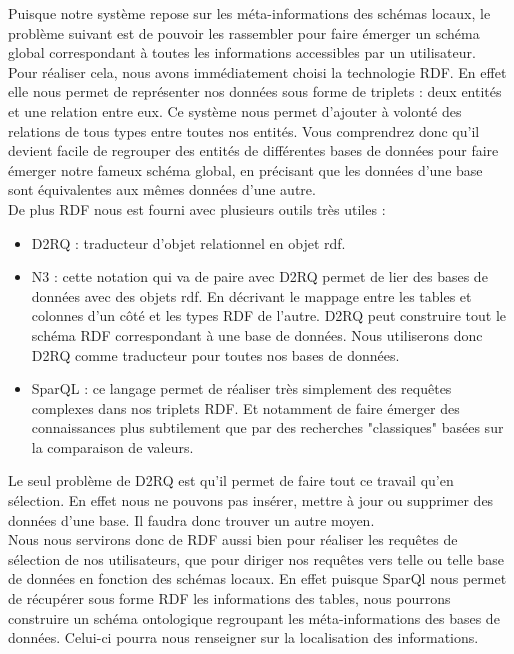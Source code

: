 \documentclass[12pt]{article}
\begin{document}
	Puisque notre système repose sur les méta-informations des schémas locaux, le problème suivant est de pouvoir les rassembler pour faire émerger un schéma global correspondant à toutes les informations accessibles par un utilisateur.\\
	\indet Pour réaliser cela, nous avons immédiatement choisi la technologie RDF. En effet elle nous permet de représenter nos données sous forme de triplets : deux entités et une relation entre eux. Ce système nous permet d'ajouter à volonté des relations de tous types entre toutes nos entités. Vous comprendrez donc qu'il devient facile de regrouper des entités de différentes bases de données pour faire émerger notre fameux schéma global, en précisant que les données d'une base sont équivalentes aux mêmes données d'une autre.\\
	\indent De plus RDF nous est fourni avec plusieurs outils très utiles :\\
	\begin{itemize}
		\item D2RQ : traducteur d'objet relationnel en objet rdf.
		\item N3 : cette notation qui va de paire avec D2RQ permet de lier des bases de données avec des objets rdf. En décrivant le mappage entre les tables et colonnes d'un côté et les types RDF de l'autre. D2RQ peut construire tout le schéma RDF correspondant à une base de données. Nous utiliserons donc D2RQ comme traducteur pour toutes nos bases de données.\\
		\item SparQL : ce langage permet de réaliser très simplement des requêtes complexes dans nos triplets RDF. Et notamment de faire émerger des connaissances plus subtilement que par des recherches "classiques" basées sur la comparaison de valeurs.\\
	\end{itemize}
	
	\indent Le seul problème de D2RQ est qu'il permet de faire tout ce travail qu'en sélection. En effet nous ne pouvons pas insérer, mettre à jour ou supprimer des données d'une base. Il faudra donc trouver un autre moyen.\\
	\indent Nous nous servirons donc de RDF aussi bien pour réaliser les requêtes de sélection de nos utilisateurs, que pour diriger nos requêtes vers telle ou telle base de données en fonction des schémas locaux. En effet puisque SparQl nous permet de récupérer sous forme RDF les informations des tables, nous pourrons construire un schéma ontologique regroupant les méta-informations des bases de données. Celui-ci pourra nous renseigner sur la localisation des informations.\\
\end{document}
